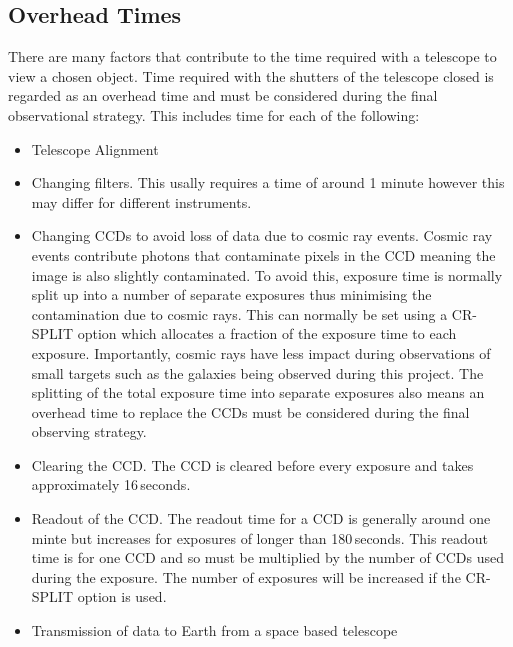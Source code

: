 	\subsection{Overhead Times} %
	\label{sub:overhead_times}
		There are many factors that contribute to the time required with a telescope to view a chosen object. Time required with the shutters of the telescope closed is regarded as an overhead time and must be considered during the final observational strategy. This includes time for each of the following\cite{Overhead_Times}:
		\begin{itemize}
			\item Telescope Alignment
			\item Changing filters. This usally requires a time of around 1 minute however this may differ for different instruments.
			\item Changing CCDs to avoid loss of data due to cosmic ray events. Cosmic ray events contribute photons that contaminate pixels in the CCD meaning the image is also slightly contaminated. To avoid this, exposure time is normally split up into a number of separate exposures thus minimising the contamination due to cosmic rays. This can normally be set using a CR-SPLIT option which allocates a fraction of the exposure time to each exposure\cite{Space_Telescope_Science_cosmic_rays}. Importantly, cosmic rays have less impact during observations of small targets such as the galaxies being observed during this project. The splitting of the total exposure time into separate exposures also means an overhead time to replace the CCDs must be considered during the final observing strategy.
			\item Clearing the CCD. The CCD is cleared before every exposure and takes approximately 16\,seconds.
			\item Readout of the CCD. The readout time for a CCD is generally around one minte but increases for exposures of longer than 180\,seconds. This readout time is for one CCD and so must be multiplied by the number of CCDs used  during the exposure. The number of exposures will be increased if the CR-SPLIT option is used.
			\item Transmission of data to Earth from a space based telescope
		\end{itemize}
